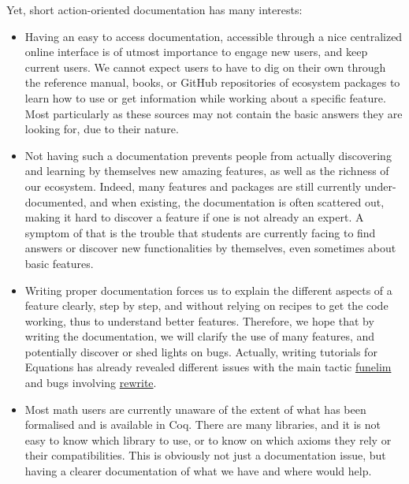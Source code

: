 \documentclass{easychair}
\begin{document}
Yet, short action-oriented documentation has many interests:
\begin{itemize}[itemsep=0pt]
  \item Having an easy to access documentation, accessible through a nice
        centralized online interface is of utmost importance to engage new
        users, and keep current users.
        We cannot expect users to have to dig on their own through the
        reference manual, books, or GitHub repositories of ecosystem packages to learn how to use or
        get information while working about a specific feature.
        Most particularly as these sources may not contain the basic answers
        they are looking for, due to their nature.
  \item Not having such a documentation prevents people from actually
        discovering and learning by themselves new amazing features, as well as
        the richness of our ecosystem.
        Indeed, many features and packages are still currently under-documented, and
        when existing, the documentation is often scattered out, making it hard
        to discover a feature if one is not already an expert.
        A symptom of that is the trouble that students are currently facing to
        find answers or discover new functionalities by themselves, even sometimes
        about basic features.
  \item Writing proper documentation forces us to explain the different aspects
        of a feature clearly, step by step, and without relying on recipes to
        get the code working, thus to understand better features.
        Therefore, we hope that by writing the documentation, we will clarify
        the use of many features, and potentially discover or shed lights on bugs.
        Actually, writing tutorials for Equations has already revealed different
        issues with the main tactic \href{https://github.com/Zimmi48/platform-docs/pull/1}{funelim}
        and bugs involving \href{https://coq.zulipchat.com/#narrow/stream/237659-Equations-devs-.26-users/topic/Bug.20funelim.20on.20Ack}{rewrite}.
  \item Most math users are currently unaware of the extent of what has been
        formalised and is available in Coq.
        There are many libraries, and it is not easy to know which library to
        use, or to know on which axioms they rely or their compatibilities.
        This is obviously not just a documentation issue, but having a clearer
        documentation of what we have and where would help.
\end{itemize}
\end{document}
